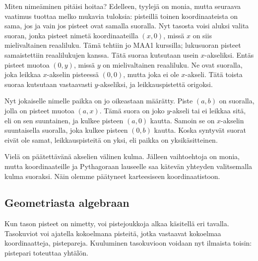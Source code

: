 Miten nimeäminen pitäisi hoitaa? Edelleen, tyylejä on monia, mutta seuraava vaatimus tuottaa melko mukavia tuloksia: pisteillä toinen koordinaateista on sama, jos ja vain jos pisteet ovat samalla suoralla. Nyt tasosta voisi aluksi valita suoran, jonka pisteet nimetä koordinaateilla $(x,0)$, missä $x$ on siis mielivaltainen reaaliluku. Tämä tehtiin jo MAA1 kurssilla; lukusuoran pisteet samaistettiin reaalilukujen kanssa. Tätä suoraa kutsutaan usein $x$-akseliksi. Entäs pisteet muotoa $(0,y)$, missä $y$ on mielivaltainen reaaliluku. Ne ovat suoralla, joka leikkaa $x$-akselin pisteessä $(0,0)$, mutta joka ei ole $x$-akseli. Tätä toista suoraa kutsutaan vastaavasti $y$-akseliksi, ja leikkauspistettä origoksi.

Nyt jokaiselle nimelle paikka on jo oikeastaan määrätty. Piste $(a,b)$ on suoralla, jolla on pisteet muotoa $(a,x)$. Tämä suora on joko $y$-akseli tai ei leikkaa sitä, eli on sen suuntainen, ja kulkee pisteen $(a,0)$ kautta. Samoin se on $x$-akselin suuntaisella suoralla, joka kulkee pisteen $(0,b)$ kautta. Koska syntyvät suorat eivät ole samat, leikkauspisteitä on yksi, eli paikka on yksikäsitteinen.

Vielä on päätettävänä akselien välinen kulma. Jälleen vaihtoehtoja on monia, mutta koordinaateille ja Pythagoraan lauseelle saa kätevän yhteyden valitsemalla kulma suoraksi. Näin olemme päätyneet karteesiseen koordinaatistoon.

\subsection*{Geometriasta algebraan}

Kun tason pisteet on nimetty, voi pistejoukkoja alkaa käsitellä eri tavalla. Tasokuviot voi ajatella kokoelmana pisteitä, jotka vastaavat kokoelmaa koordinaatteja, pistepareja. Kuuluminen tasokuvioon voidaan nyt ilmaista toisin: pistepari toteuttaa yhtälön.